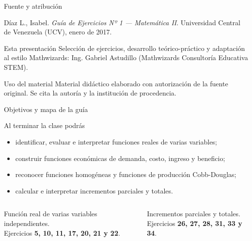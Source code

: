 \documentclass[aspectratio=169]{beamer}
\begin{document}
\begin{frame}[plain]
  \titlepage
\end{frame}

\begin{frame}{Fuente y atribución}
  \begin{mwextra}
    Díaz L., Isabel. \emph{Guía de Ejercicios Nº 1 — Matemática II}.
    Universidad Central de Venezuela (UCV), enero de 2017.
  \end{mwextra}
  \begin{block}{Esta presentación}
    Selección de ejercicios, desarrollo teórico-práctico y adaptación
    al estilo Mathwizards: Ing. Gabriel Astudillo
    (Mathwizards Consultoría Educativa STEM).
  \end{block}
  \begin{alertblock}{Uso del material}
    Material didáctico elaborado con autorización de la fuente original.
    Se cita la autoría y la institución de procedencia.
  \end{alertblock}
\end{frame}

\begin{frame}{Objetivos y mapa de la guía}
  \begin{block}{Al terminar la clase podrás}
    \begin{itemize}
      \item identificar, evaluar e interpretar funciones reales de varias variables;
      \item construir funciones económicas de demanda, costo, ingreso y beneficio;
      \item reconocer funciones homogéneas y funciones de producción Cobb-Douglas;
      \item calcular e interpretar incrementos parciales y totales.
    \end{itemize}
  \end{block}
  \vspace{2pt}
  \begin{columns}[T]
    \begin{mwextra}
      Función real de varias variables independientes.\\
      Ejercicios \textbf{5, 10, 11, 17, 20, 21 y 22}.
    \end{mwextra}
    \begin{mwextra}
      Incrementos parciales y totales.\\
      Ejercicios \textbf{26, 27, 28, 31, 33 y 34}.
    \end{mwextra}
  \end{columns}
\end{frame}
\end{document}
